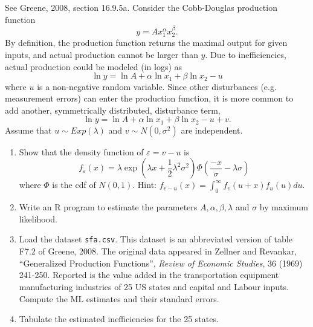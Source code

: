 \documentclass{article}
\begin{document}
See Greene, 2008, section 16.9.5a. Consider the Cobb-Douglas production
function%
\begin{equation*}
y=Ax_{1}^{\alpha }x_{2}^{\beta }.
\end{equation*}%
By definition, the production function returns the maximal output for given
inputs, and actual production cannot be larger than $y$. Due to
inefficiencies, actual production could be modeled (in logs) as%
\begin{equation*}
\ln y=\ln A+\alpha \ln x_{1}+\beta \ln x_{2}-u
\end{equation*}%
where $u$ is a non-negative random variable. Since other disturbances (e.g.
measurement errors) can enter the production function, it is more common to
add another, symmetrically distributed, disturbance term,%
\begin{equation*}
\ln y=\ln A+\alpha \ln x_{1}+\beta \ln x_{2}-u+v.
\end{equation*}%
Assume that $u\sim Exp\left( \lambda \right) $ and $v\sim N(0,\sigma ^{2})$
are independent.

\begin{enumerate}
\item Show that the density function of $\varepsilon =v-u$ is%
\begin{equation*}
f_{\varepsilon }\left( x\right) =\lambda\exp \left( \lambda x+%
\frac{1}{2}\lambda ^{2}\sigma ^{2}\right) \Phi \left( \frac{-x}{\sigma }%
-\lambda \sigma \right)
\end{equation*}%
where $\Phi $ is the cdf of $N(0,1)$. Hint: $f_{v-u}(x)=\int_{0}^{\infty
}f_{v}\left( u+x\right) f_{u}\left( u\right) du$.

\item Write an R program to estimate the parameters $A,\alpha ,\beta
,\lambda $ and $\sigma $ by maximum likelihood.

\item Load the dataset \texttt{sfa.csv}. This dataset is an abbreviated
version of table F7.2 of Greene, 2008. The original data appeared in Zellner
and Revankar, \textquotedblleft Generalized Production
Functions\textquotedblright , \emph{Review of Economic Studies}, 36 (1969)
241-250. Reported is the value added in the transportation equipment
manufacturing industries of 25 US states and capital and Labour inputs.
Compute the ML estimates and their standard errors.

\item Tabulate the estimated inefficiencies for the 25 states.
\end{enumerate}
\end{document}
